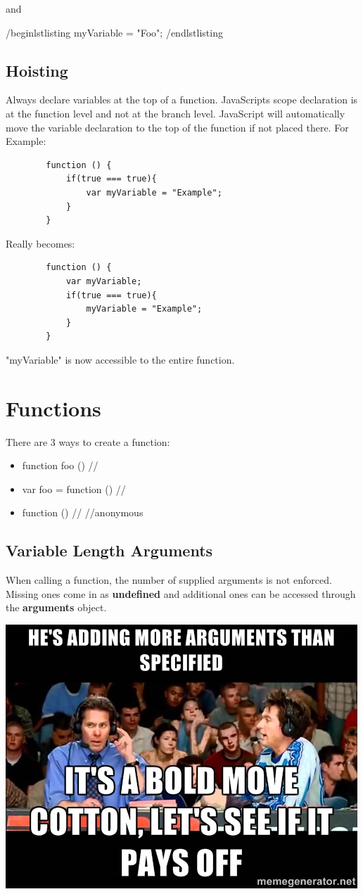 \documentclass {amsart}
\begin{document}
	and 

	/begin{lstlisting}
		myVariable = "Foo";
	/end{lstlisting}
	\subsection{Hoisting}  Always declare variables at the top of a function.  JavaScripts scope declaration is at the function level and not at the branch level.  JavaScript will automatically move the variable declaration to the top of the function if not placed there. For Example: 
	\begin{lstlisting}
		function () {
			if(true === true){
				var myVariable = "Example";
			}
		}
	\end{lstlisting}

Really becomes: 

	\begin{lstlisting}
		function () {
			var myVariable; 
			if(true === true){
				myVariable = "Example";
			}
		}
	\end{lstlisting}
"myVariable" is now accessible to the entire function.  

\section{Functions}
	There are 3 ways to create a function: 
	\begin{itemize}
		\item function foo () /{/}
		\item var foo = function () /{/}
		\item function () /{/} //anonymous
	\end{itemize}
	\subsection{Variable Length Arguments}  When calling a function, the number of supplied arguments is not enforced.  Missing ones come in as {\bf undefined} and additional ones can be accessed through the {\bf arguments} object. 

	\includegraphics{MoreArgumentsThanSpecified.jpg}
\end{document}
